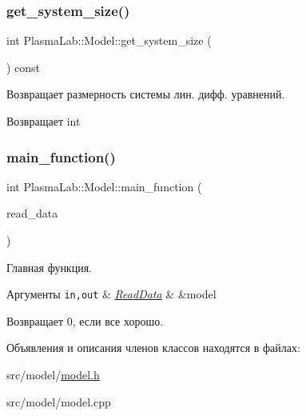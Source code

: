 \subsubsection{\texorpdfstring{get\+\_\+system\+\_\+size()}{get\_system\_size()}}
{\footnotesize\ttfamily int Plasma\+Lab\+::\+Model\+::get\+\_\+system\+\_\+size (\begin{DoxyParamCaption}{ }\end{DoxyParamCaption}) const\hspace{0.3cm}{\ttfamily [inline]}}



Возвращает размерность системы лин. дифф. уравнений. 

\begin{DoxyReturn}{Возвращает}
int 
\end{DoxyReturn}
\mbox{\label{class_plasma_lab_1_1_model_ab25a8b432256087bdd476b8aafed963c}} 
\subsubsection{\texorpdfstring{main\+\_\+function()}{main\_function()}}
{\footnotesize\ttfamily int Plasma\+Lab\+::\+Model\+::main\+\_\+function (\begin{DoxyParamCaption}\item[{\hyperlink{class_plasma_lab_1_1_read_data}{Read\+Data} \&}]{read\+\_\+data }\end{DoxyParamCaption})}



Главная функция. 


\begin{DoxyParams}[1]{Аргументы}
\mbox{\tt in,out}  & {\em \hyperlink{class_plasma_lab_1_1_read_data}{Read\+Data}} & \&model \\
\hline
\end{DoxyParams}
\begin{DoxyReturn}{Возвращает}
0, если все хорошо. 
\end{DoxyReturn}


Объявления и описания членов классов находятся в файлах\+:\begin{DoxyCompactItemize}
\item 
src/model/\hyperlink{model_8h}{model.\+h}\item 
src/model/model.\+cpp\end{DoxyCompactItemize}
